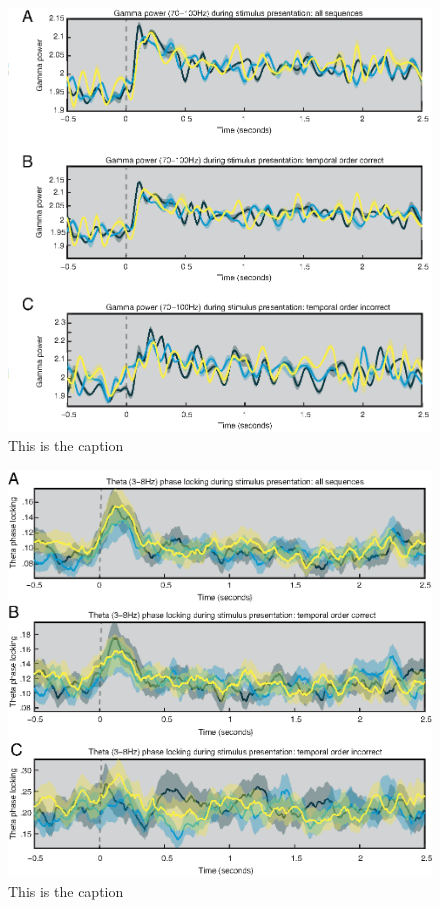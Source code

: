 \begin{figure}[htbp]
\centering
\includegraphics{figures/chapter3_suppfigure7}
\caption{This is the caption}
\end{figure}

\begin{figure}[htbp]
\centering
\includegraphics{figures/chapter3_suppfigure8}
\caption{This is the caption}
\end{figure}

